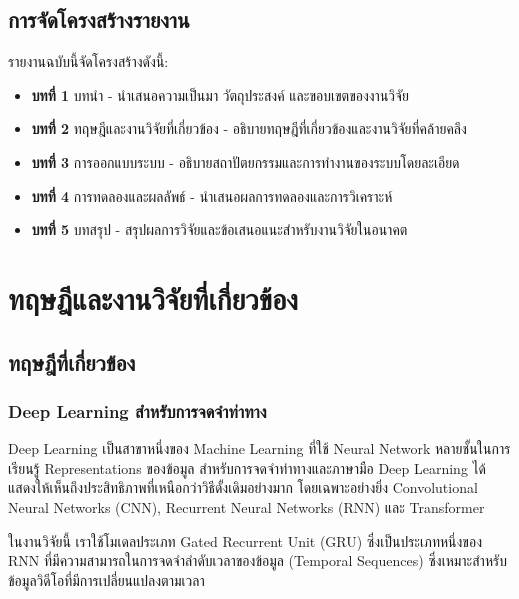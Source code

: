 \documentclass[12pt,a4paper]{report}
\begin{document}
\section{การจัดโครงสร้างรายงาน}

รายงานฉบับนี้จัดโครงสร้างดังนี้:

\begin{itemize}
    \item \textbf{บทที่ 1} บทนำ - นำเสนอความเป็นมา วัตถุประสงค์ และขอบเขตของงานวิจัย
    \item \textbf{บทที่ 2} ทฤษฎีและงานวิจัยที่เกี่ยวข้อง - อธิบายทฤษฎีที่เกี่ยวข้องและงานวิจัยที่คล้ายคลึง
    \item \textbf{บทที่ 3} การออกแบบระบบ - อธิบายสถาปัตยกรรมและการทำงานของระบบโดยละเอียด
    \item \textbf{บทที่ 4} การทดลองและผลลัพธ์ - นำเสนอผลการทดลองและการวิเคราะห์
    \item \textbf{บทที่ 5} บทสรุป - สรุปผลการวิจัยและข้อเสนอแนะสำหรับงานวิจัยในอนาคต
\end{itemize}

\clearpage

\chapter{ทฤษฎีและงานวิจัยที่เกี่ยวข้อง}

\section{ทฤษฎีที่เกี่ยวข้อง}

\subsection{Deep Learning สำหรับการจดจำท่าทาง}

Deep Learning เป็นสาขาหนึ่งของ Machine Learning ที่ใช้ Neural Network หลายชั้นในการเรียนรู้ Representations ของข้อมูล 
สำหรับการจดจำท่าทางและภาษามือ Deep Learning ได้แสดงให้เห็นถึงประสิทธิภาพที่เหนือกว่าวิธีดั้งเดิมอย่างมาก 
โดยเฉพาะอย่างยิ่ง Convolutional Neural Networks (CNN), Recurrent Neural Networks (RNN) และ Transformer

ในงานวิจัยนี้ เราใช้โมเดลประเภท Gated Recurrent Unit (GRU) ซึ่งเป็นประเภทหนึ่งของ RNN 
ที่มีความสามารถในการจดจำลำดับเวลาของข้อมูล (Temporal Sequences) ซึ่งเหมาะสำหรับข้อมูลวิดีโอที่มีการเปลี่ยนแปลงตามเวลา
\end{document}
